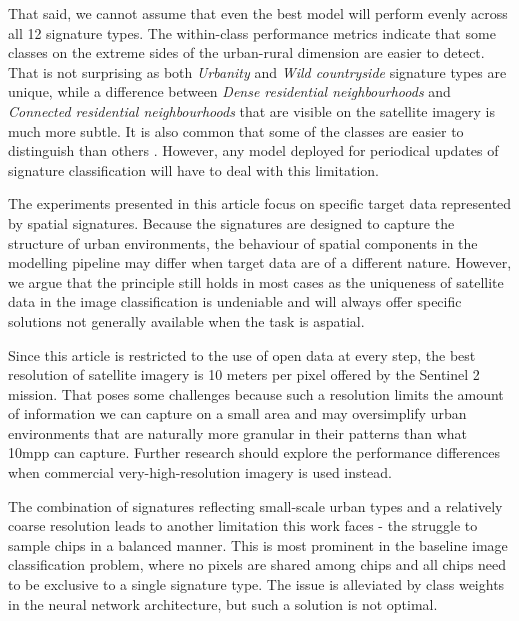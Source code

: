 \documentclass[]{interact}
\theoremstyle{plain}%
\theoremstyle{definition}
\theoremstyle{remark}
\begin{document}
That said, we cannot assume that even the best model will perform evenly across all 12
signature types. The within-class performance metrics indicate that some classes on the
extreme sides of the urban-rural dimension are easier to detect. That is not surprising
as both \textit{Urbanity} and \textit{Wild countryside} signature types are unique,
while a difference between \textit{Dense residential neighbourhoods} and
\textit{Connected residential neighbourhoods} that are visible on the satellite imagery
is much more subtle. It is also common that some of the classes are easier to
distinguish than others \cite{zanaga_daniele_2021_5571936, karra2021global}. However,
any model deployed for periodical updates of signature classification will have to deal
with this limitation.

The experiments presented in this article focus on specific target data represented by
spatial signatures. Because the signatures are designed to capture the structure of urban
environments, the behaviour of spatial components in the modelling pipeline may differ
when target data are of a different nature. However, we argue that the
principle still holds in most cases as the uniqueness of satellite data in the image
classification is undeniable and will always offer specific solutions not generally
available when the task is aspatial.

Since this article is restricted to the use of open data at every step, the best
resolution of satellite imagery is 10 meters per pixel offered by the Sentinel 2
mission. That poses some challenges because such a resolution limits the amount of
information we can capture on a small area and may oversimplify urban environments that
are naturally more granular in their patterns than what 10mpp can capture. Further
research should explore the performance differences when commercial very-high-resolution
imagery is used instead.

The combination of signatures reflecting small-scale urban types and a relatively coarse
resolution leads to another limitation this work faces - the struggle to sample chips
in a balanced manner. This is most prominent in the baseline image classification
problem, where no pixels are shared among chips and all chips need to be exclusive to a
single signature type. The issue is alleviated by class weights in the neural network
architecture, but such a solution is not optimal.
\end{document}
